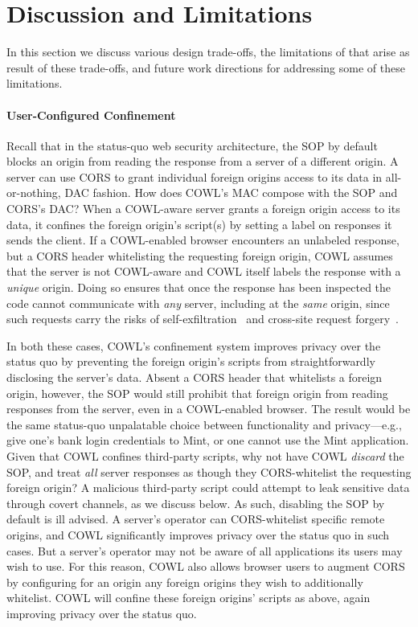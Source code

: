 \section{Discussion and Limitations}
\label{sec:discussion}

In this section we discuss various design trade-offs, the limitations
of \sys{} that arise as result of these trade-offs, and future work
directions for addressing some of these limitations.

\paragraph{User-Configured Confinement}  Recall that in the
status-quo web security architecture, the SOP by default blocks an
origin from reading the response from a server of a different
origin. A server can use CORS to grant individual foreign origins
access to its data in all-or-nothing, DAC fashion. How does COWL's MAC
compose with the SOP and CORS's DAC? When a COWL-aware server grants a
foreign origin access to its data, it confines the foreign origin's
script(s) by setting a label on responses it sends the client. If a
COWL-enabled browser encounters an unlabeled response, but a CORS
header whitelisting the requesting foreign origin, COWL assumes that
the server is not COWL-aware and COWL itself labels the response with
a \emph{unique} origin.
Doing so ensures that once the response has been inspected the code
cannot communicate with \emph{any} server, including at the
\emph{same} origin,
since such requests carry the risks of
self-exfiltration~\cite{selfex} and cross-site request
forgery~\cite{CSRF}.

In both these cases, COWL's confinement system improves privacy over
the status quo by preventing the foreign origin's scripts from
straightforwardly disclosing the server's data. Absent a CORS header
that whitelists a foreign origin, however, the SOP would still
prohibit that foreign origin from reading responses from the server,
even in a COWL-enabled browser. The result would be the same
status-quo unpalatable choice between functionality and
privacy---e.g., give one's bank login credentials to Mint, or one
cannot use the Mint application. Given that COWL confines third-party
scripts, why not have COWL {\em discard} the SOP, and treat {\em all}
server responses as though they CORS-whitelist the requesting foreign
origin? A malicious third-party script could attempt to leak sensitive
data through covert channels, as we discuss below. As such, disabling
the SOP by default is ill advised. A server's operator can
CORS-whitelist specific remote origins, and COWL significantly
improves privacy over the status quo in such cases. But a server's
operator may not be aware of all applications its users may wish to
use. For this reason, COWL also allows browser users to augment CORS
by configuring for an origin any foreign origins they wish to
additionally whitelist. COWL will confine these foreign origins'
scripts as above, again improving privacy over the status quo.

